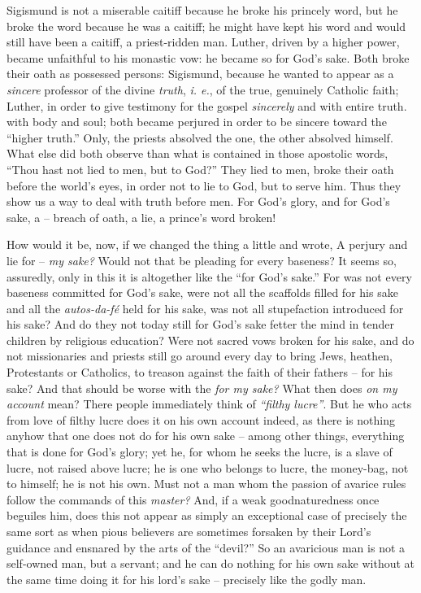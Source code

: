 \documentclass[12pt,a4paper]{book}
\begin{document}
Sigismund is not a miserable caitiff because he broke his princely word, but 
he broke the word because he was a caitiff; he might have kept his word and 
would still have been a caitiff, a priest-ridden man. Luther, driven by a 
higher power, became unfaithful to his monastic vow: he became so for God's 
sake. Both broke their oath as possessed persons: Sigismund, because he wanted 
to appear as a \textit{sincere} professor of the divine \textit{truth}, 
\textit{i. e.}, of the true, genuinely Catholic faith; Luther, in order to 
give testimony for the gospel \textit{sincerely} and with entire truth. with 
body and soul; both became perjured in order to be sincere toward the 
``higher truth.'' Only, the priests absolved the one, the other absolved 
himself. What else did both observe than what is contained in those apostolic 
words, ``Thou hast not lied to men, but to God?'' They lied to men, broke 
their oath before the world's eyes, in order not to lie to God, but to serve 
him. Thus they show us a way to deal with truth before men. For God's glory, 
and for God's sake, a -- breach of oath, a lie, a prince's word broken!

How would it be, now, if we changed the thing a little and wrote, A perjury 
and lie for -- \textit{my sake?} Would not that be pleading for every 
baseness? It seems so, assuredly, only in this it is altogether like the 
``for God's sake.'' For was not every baseness committed for God's sake, 
were not all the scaffolds filled for his sake and all the 
\textit{autos-da-f\'e} held for his sake, was not all stupefaction introduced 
for his sake? And do they not today still for God's sake fetter the mind in 
tender children by religious education? Were not sacred vows broken for his 
sake, and do not missionaries and priests still go around every day to bring 
Jews, heathen, Protestants or Catholics, to treason against the faith of their 
fathers -- for his sake? And that should be worse with the \textit{for my 
sake?} What then does \textit{on my account} mean? There people immediately 
think of \textit{``filthy lucre''}. But he who acts from love of filthy 
lucre does it on his own account indeed, as there is nothing anyhow that one 
does not do for his own sake -- among other things, everything that is done 
for God's glory; yet he, for whom he seeks the lucre, is a slave of lucre, not 
raised above lucre; he is one who belongs to lucre, the money-bag, not to 
himself; he is not his own. Must not a man whom the passion of avarice rules 
follow the commands of this \textit{master?} And, if a weak goodnaturedness 
once beguiles him, does this not appear as simply an exceptional case of 
precisely the same sort as when pious believers are sometimes forsaken by 
their Lord's guidance and ensnared by the arts of the ``devil?'' So an 
avaricious man is not a self-owned man, but a servant; and he can do nothing 
for his own sake without at the same time doing it for his lord's sake -- 
precisely like the godly man.
\end{document}
